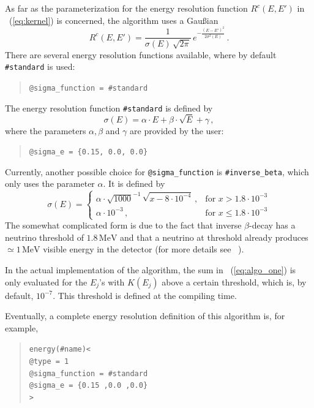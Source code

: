 %
As far as the parameterization for the energy resolution function 
$R^c(E,E')$ in \eq~(\ref{eq:kernel}) is concerned, the algorithm uses
a Gau\ss ian
\begin{equation}
R^c(E,E')=\frac{1}{\sigma(E)\,\sqrt{2\pi}}\,e^{-\frac{(E-E')^2}{2\sigma^2(E)}} \, .
\end{equation} 
%
%
There are several energy resolution functions available, where by default
{\tt \#standard} is used:
\begin{quote}
{\tt \tb @sigma\_function = \#standard} 
\end{quote}
%
%
The energy resolution function {\tt \#standard} is defined by
\begin{equation}
\label{eq:sigma_e}
\sigma(E)=\alpha\cdot E + \beta \cdot \sqrt{E} +\gamma\, ,
\end{equation}
where the parameters $\alpha, \beta$ and $\gamma$ are provided by the user:
\begin{quote}
{\tt \tb @sigma\_e = \{0.15, 0.0, 0.0\}}
\end{quote}
Currently, another possible choice for {\tt @sigma\_function} is {\tt \#inverse\_beta},
%
%
which only uses the parameter $\alpha$. It is defined by
\begin{equation}
\sigma(E)= \left\{\begin{array}{cl}
 \alpha \cdot \sqrt{1000}^{-1}\,\sqrt{x-8\cdot10^{-4}}\,,&\mathrm{for}\,\, 
x>1.8\cdot10^{-3}\\
\alpha\cdot10^{-3} \,,&\mathrm{for}\,\, x \leq 1.8\cdot10^{-3}
\end{array} \right.
\end{equation}
The somewhat complicated form is due to the fact that inverse $\beta$-decay
has a neutrino threshold of $1.8\,\mathrm{MeV}$ and that a neutrino
at threshold already produces $\simeq 1\,\mathrm{MeV}$ visible energy in
the detector (for more details see \eg~\cite{Huber:2003pm}). 

In the actual implementation of the algorithm,  the sum in \eq~(\ref{eq:algo_one}) is only evaluated
 for the $E_j$'s with $K(E_j)$ 
above a certain threshold, which is, by default, $10^{-7}$. 
This threshold is defined at the compiling time. 

Eventually,  a complete energy resolution definition of this 
algorithm is, for example,
\begin{quote}
{\tt energy(\#name)<\\
\tb @type = 1\\
\tb @sigma\_function = \#standard\\
\tb @sigma\_e = \{0.15 ,0.0 ,0.0\}\\
>
}
\end{quote}


